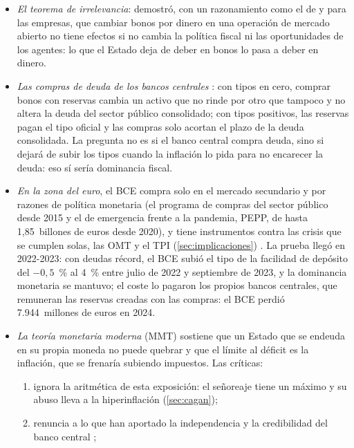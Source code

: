 \documentclass[11pt]{article}
\begin{document}
\begin{itemize}
\item \emph{El teorema de irrelevancia}: \textcite{Wallace1981ModiglianiMiller} demostró, con un razonamiento como el de  y  para las empresas, que cambiar bonos por dinero en una operación de mercado abierto no tiene efectos si no cambia la política fiscal ni las oportunidades de los agentes: lo que el Estado deja de deber en bonos lo pasa a deber en dinero.
\item \emph{Las compras de deuda de los bancos centrales} : con tipos en cero, comprar bonos con reservas cambia un activo que no rinde por otro que tampoco y no altera la deuda del sector público consolidado\nocite{BlanchardPisaniFerry2020Monetisation}; con tipos positivos, las reservas pagan el tipo oficial y las compras solo acortan el plazo de la deuda consolidada. La pregunta no es si el banco central compra deuda, sino si dejará de subir los tipos cuando la inflación lo pida para no encarecer la deuda: eso sí sería dominancia fiscal.
\item \emph{En la zona del euro}, el BCE compra solo en el mercado secundario y por razones de política monetaria (el programa de compras del sector público desde 2015 y el de emergencia frente a la pandemia, PEPP, de hasta 1,85~billones de euros desde 2020\nocite{BCE2026PEPP}), y tiene instrumentos contra las crisis que se cumplen solas, las OMT y el TPI (\ref{sec:implicaciones}) . La prueba llegó en 2022-2023: con deudas récord, el BCE subió el tipo de la facilidad de depósito del $-0{,}5$~\% al 4~\% entre julio de 2022 y septiembre de 2023\nocite{BCE2026TiposOficiales}, y la dominancia monetaria se mantuvo; el coste lo pagaron los propios bancos centrales, que remuneran las reservas creadas con las compras: el BCE perdió 7.944~millones de euros en 2024\nocite{BCE2025Cuentas2024}.
\item \emph{La teoría monetaria moderna} (MMT) sostiene que un Estado que se endeuda en su propia moneda no puede quebrar y que el límite al déficit es la inflación, que se frenaría subiendo impuestos\nocite{Wray2012Modern,Kelton2020Deficit}. Las críticas:
  \begin{enumerate}
  \item ignora la aritmética de esta exposición: el señoreaje tiene un máximo y su abuso lleva a la hiperinflación (\ref{sec:cagan});
  \item renuncia a lo que han aportado la independencia y la credibilidad del banco central\nocite{KydlandPrescott1977Rules} ;

\end{enumerate}
\end{itemize}
\end{document}
